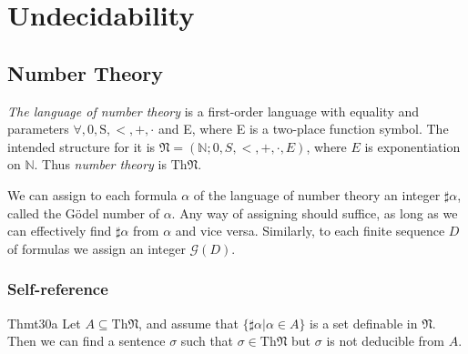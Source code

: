 \chapter{Undecidability}
\setcounter{section}{-1}

\section{Number Theory}

\textit{The language of number theory} is a first-order language with equality and parameters $\forall, 0, \mathrm{S}, <, +, \cdot$ and E, where E is a two-place function symbol. The intended structure for it is $\mathfrak{N}=(\mathbb{N};0,S,<,+,\cdot,E)$, where $E$ is exponentiation on $\mathbb{N}$. Thus \textit{number theory} is $\mathrm{Th}\mathfrak{N}$.

We can assign to each formula $\alpha$ of the language of number theory an integer $\sharp \alpha$, called the G\"odel number of $\alpha$. Any way of assigning should suffice, as long as we can effectively find $\sharp \alpha$ from $\alpha$ and vice versa. Similarly, to each finite sequence $D$ of formulas we assign an integer $\mathcal G(D)$.

\subsection*{Self-reference}

\begin{reference}{Thm}{t30a}
  Let $A\subseteq \mathrm{Th}\mathfrak{N}$, and assume that $\{\sharp\alpha|\alpha\in A\}$ is a set definable in $\mathfrak{N}$. Then we can find a sentence $\sigma$ such that $\sigma\in \mathrm{Th}\mathfrak{N}$ but $\sigma$ is not deducible from $A$.
\end{reference}

